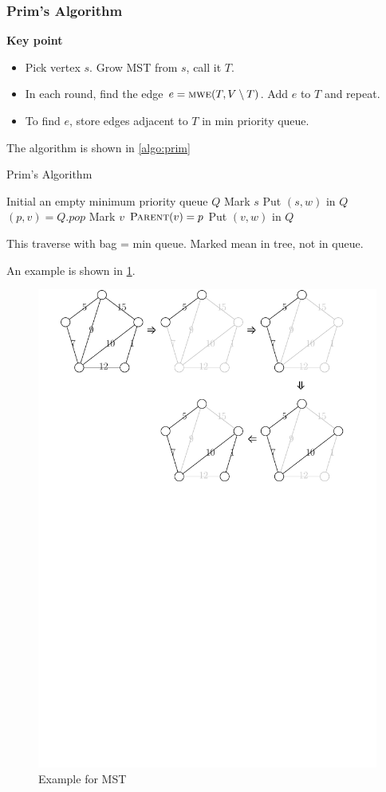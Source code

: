 \subsubsection{Prim's Algorithm}
\vspace{0.1in}\noindent\textbf{Key point}
\begin{itemize}
    \item Pick vertex $s$. Grow MST from $s$, call it $T$.
    \item In each round, find the edge
        $e = \textsc{mwe} (T, V \setminus T)$.
        Add $e$ to $T$ and repeat.
    \item To find $e$, store edges adjacent to $T$
        in min priority queue.
\end{itemize}
The algorithm is shown in \cref{algo:prim}
\begin{algorithm}[H]
    \caption{Prim's Algorithm}\label{algo:prim}
    \begin{algorithmic}[1]
            \State Initial an empty minimum priority queue $Q$
            \State Mark $s$
                \State Put $(s,w)$ in $Q$
            \EndFor
                \State $(p,v) = Q.pop$
                    \State Mark $v$
                    \State $\textsc{Parent} (v) = p$
                        \State Put $(v,w)$ in $Q$
                    \EndFor
                \EndIf
            \EndWhile
        \EndProcedure
    \end{algorithmic}
\end{algorithm}

\observation
This traverse with bag = min queue. Marked mean in tree, not in queue.

An example is shown in \cref{fig:prim}.
\begin{figure}[ht!]
    \caption{Example for MST}\label{fig:prim}
    \centering
    \includegraphics[width=.6\linewidth]{fig/PrimExample}
\end{figure}

